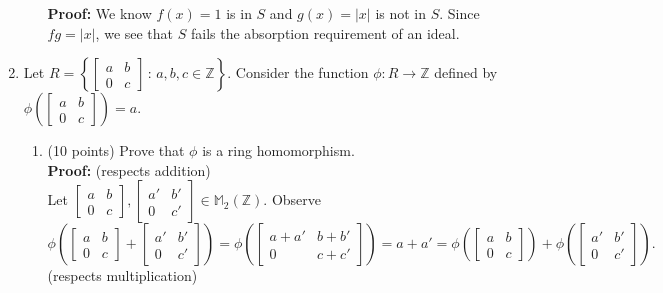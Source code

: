\documentclass[12pt]{article}
\newcommand{\bbZ}{\mathbb{Z}}
\newcommand{\bbM}{\mathbb{M}}
\begin{document}
\begin{enumerate}
\begin{enumerate}
	\textbf{Proof:} We know $f(x)=1$ is in $S$ and $g(x)=|x|$ is not in $S$. Since $fg=|x|$, we see that $S$ fails the absorption requirement of an ideal.
	\vfill
	\end{enumerate}
\item Let $R=\left\{\begin{bmatrix} a&b\\0&c \end{bmatrix} \, : \, a,b,c \in \bbZ \right\}.$ Consider the function $\phi: R \to \bbZ$ defined by $\phi \left( \begin{bmatrix} a&b\\0&c \end{bmatrix} \right)=a.$
	\begin{enumerate}
	\item ({\small 10 points}) Prove that $\phi$ is a ring homomorphism.\\
	
	\textbf{Proof:} (respects addition)\\
	Let $\begin{bmatrix} a&b\\0&c \end{bmatrix}, \begin{bmatrix} a'&b'\\0&c' \end{bmatrix} \in \bbM_2(\bbZ).$ Observe \\
	
	$\phi \left(\begin{bmatrix} a&b\\0&c \end{bmatrix}+ \begin{bmatrix} a'&b'\\0&c' \end{bmatrix} \right) = 
	\phi \left(\begin{bmatrix} a+a'&b+b'\\0&c+c' \end{bmatrix} \right)=a+a'=
	\phi \left(\begin{bmatrix} a&b\\0&c \end{bmatrix}\right)+\phi\left( \begin{bmatrix} a'&b'\\0&c' \end{bmatrix} \right).$\\
	
(respects multiplication)\\	


\end{enumerate}
\end{enumerate}
\end{document}
